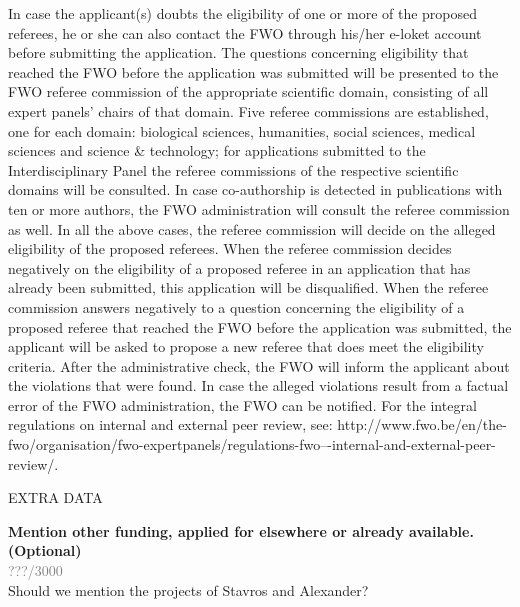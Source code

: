 \documentclass[11pt,dvipsnames,usenames,a4paper]{article}
\begin{document}
{In case the applicant(s) doubts the eligibility of one or more of the proposed referees, he or she can also contact the FWO through his/her e-loket account before submitting the application. The questions concerning eligibility that reached the FWO before the application was submitted will be presented to the FWO referee commission of the appropriate scientific domain, consisting of all expert panels’ chairs of that domain. Five referee commissions are established, one for each domain: biological sciences, humanities, social sciences, medical sciences and science \& technology; for applications submitted to the Interdisciplinary Panel the referee commissions of the respective scientific domains will be consulted. In case co-authorship is detected in publications with ten or more authors, the FWO administration will consult the referee commission as well. In all the above cases, the referee commission will decide on the alleged eligibility of the proposed referees. When the referee commission decides negatively on the eligibility of a proposed referee in an application that has already been submitted, this application will be disqualified. When the referee commission answers negatively to a question concerning the eligibility of a proposed referee that reached the FWO before the application was submitted, the applicant will be asked to propose a new referee that does meet the eligibility criteria. 
After the administrative check, the FWO will inform the applicant about the violations that were found. In case the alleged violations result from a factual error of the FWO administration, the FWO can be notified. 
For the integral regulations on internal and external peer review, see: http://www.fwo.be/en/the-fwo/organisation/fwo-expertpanels/regulations-fwo–-internal-and-external-peer-review/.}

\vspace{10pt}

\begin{shaded}\centering EXTRA DATA \end{shaded}

\textbf{Mention other funding, applied for elsewhere or already available. (Optional)}\\
\textcolor{Gray}{???/3000}\\

Should we mention the projects of Stavros and Alexander?


\vspace{7pt}
\end{document}

